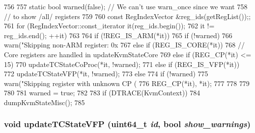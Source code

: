 \begin{DoxyCode}
756 {
757     static bool warned(false); // We can't use warn_once since we want
758                                // to show /all/ registers
759 
760     const RegIndexVector &reg_ids(getRegList());;
761     for (RegIndexVector::const_iterator it(reg_ids.begin());
762          it != reg_ids.end(); ++it) {
763 
764         if (!REG_IS_ARM(*it)) {
765             if (!warned)
766                 warn("Skipping non-ARM register: 0x%
767         } else if (REG_IS_CORE(*it)) {
768             // Core registers are handled in updateKvmStateCore
769         } else if (REG_CP(*it) <= 15) {
770             updateTCStateCoProc(*it, !warned);
771         } else if (REG_IS_VFP(*it)) {
772             updateTCStateVFP(*it, !warned);
773         } else {
774             if (!warned) {
775                 warn("Skipping register with unknown CP (%
776                      REG_CP(*it), *it);
777             }
778         }
779     }
780 
781     warned = true;
782 
783     if (DTRACE(KvmContext))
784         dumpKvmStateMisc();
785 }
\end{DoxyCode}
\hypertarget{classArmKvmCPU_a94714d5528a5c80d1e0f9fe250514a07}{
\subsubsection[{updateTCStateVFP}]{\setlength{\rightskip}{0pt plus 5cm}void updateTCStateVFP (uint64\_\-t {\em id}, \/  bool {\em show\_\-warnings})}}
\label{classArmKvmCPU_a94714d5528a5c80d1e0f9fe250514a07}



